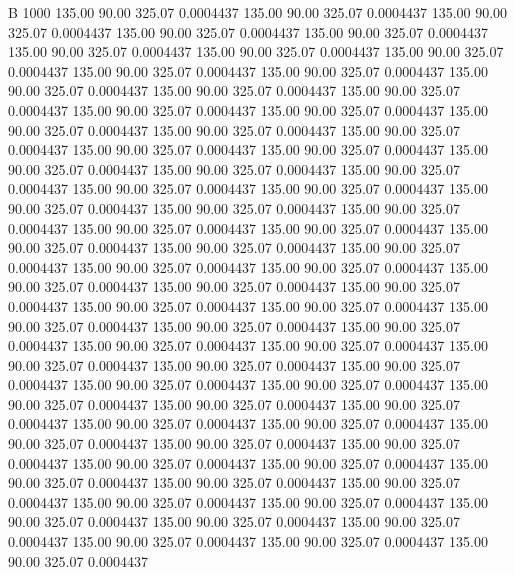 


B 1000
 135.00   90.00  325.07   0.0004437
 135.00   90.00  325.07   0.0004437
 135.00   90.00  325.07   0.0004437
 135.00   90.00  325.07   0.0004437
 135.00   90.00  325.07   0.0004437
 135.00   90.00  325.07   0.0004437
 135.00   90.00  325.07   0.0004437
 135.00   90.00  325.07   0.0004437
 135.00   90.00  325.07   0.0004437
 135.00   90.00  325.07   0.0004437
 135.00   90.00  325.07   0.0004437
 135.00   90.00  325.07   0.0004437
 135.00   90.00  325.07   0.0004437
 135.00   90.00  325.07   0.0004437
 135.00   90.00  325.07   0.0004437
 135.00   90.00  325.07   0.0004437
 135.00   90.00  325.07   0.0004437
 135.00   90.00  325.07   0.0004437
 135.00   90.00  325.07   0.0004437
 135.00   90.00  325.07   0.0004437
 135.00   90.00  325.07   0.0004437
 135.00   90.00  325.07   0.0004437
 135.00   90.00  325.07   0.0004437
 135.00   90.00  325.07   0.0004437
 135.00   90.00  325.07   0.0004437
 135.00   90.00  325.07   0.0004437
 135.00   90.00  325.07   0.0004437
 135.00   90.00  325.07   0.0004437
 135.00   90.00  325.07   0.0004437
 135.00   90.00  325.07   0.0004437
 135.00   90.00  325.07   0.0004437
 135.00   90.00  325.07   0.0004437
 135.00   90.00  325.07   0.0004437
 135.00   90.00  325.07   0.0004437
 135.00   90.00  325.07   0.0004437
 135.00   90.00  325.07   0.0004437
 135.00   90.00  325.07   0.0004437
 135.00   90.00  325.07   0.0004437
 135.00   90.00  325.07   0.0004437
 135.00   90.00  325.07   0.0004437
 135.00   90.00  325.07   0.0004437
 135.00   90.00  325.07   0.0004437
 135.00   90.00  325.07   0.0004437
 135.00   90.00  325.07   0.0004437
 135.00   90.00  325.07   0.0004437
 135.00   90.00  325.07   0.0004437
 135.00   90.00  325.07   0.0004437
 135.00   90.00  325.07   0.0004437
 135.00   90.00  325.07   0.0004437
 135.00   90.00  325.07   0.0004437
 135.00   90.00  325.07   0.0004437
 135.00   90.00  325.07   0.0004437
 135.00   90.00  325.07   0.0004437
 135.00   90.00  325.07   0.0004437
 135.00   90.00  325.07   0.0004437
 135.00   90.00  325.07   0.0004437
 135.00   90.00  325.07   0.0004437
 135.00   90.00  325.07   0.0004437
 135.00   90.00  325.07   0.0004437
 135.00   90.00  325.07   0.0004437
 135.00   90.00  325.07   0.0004437
 135.00   90.00  325.07   0.0004437
 135.00   90.00  325.07   0.0004437
 135.00   90.00  325.07   0.0004437
 135.00   90.00  325.07   0.0004437
 135.00   90.00  325.07   0.0004437
 135.00   90.00  325.07   0.0004437
 135.00   90.00  325.07   0.0004437
 135.00   90.00  325.07   0.0004437
 135.00   90.00  325.07   0.0004437
 135.00   90.00  325.07   0.0004437
